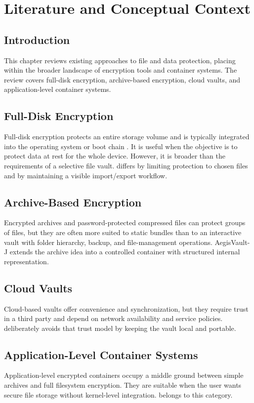 \chapter{Literature and Conceptual Context}
\section{Introduction}
This chapter reviews existing approaches to file and data protection, placing \projname{}  within the broader landscape of encryption tools and container systems. The review covers full-disk encryption, archive-based encryption, cloud vaults, and application-level container systems.

\section{Full-Disk Encryption}
Full-disk encryption  protects an entire storage volume and is typically integrated into the operating system or boot chain \cite{veracrypt}. It is useful when the objective is to protect data at rest for the whole device. However, it is broader than the requirements of a selective file vault. \projname{} differs by limiting protection to chosen files and by maintaining a visible import/export workflow.

\section{Archive-Based Encryption}
Encrypted archives  and password-protected compressed files can protect groups of files, but they are often more suited to static bundles than to an interactive vault with folder hierarchy, backup, and file-management operations. AegisVault-J extends the archive idea into a controlled container with structured internal representation.

\section{Cloud Vaults}
Cloud-based vaults  offer convenience and synchronization, but they require trust in a third party and depend on network availability and service policies. \projname{} deliberately avoids that trust model by keeping the vault local and portable.

\section{Application-Level Container Systems}
Application-level encrypted containers  occupy a middle ground between simple archives and full filesystem encryption. They are suitable when the user wants secure file storage without kernel-level integration. \projname{} belongs to this category.
